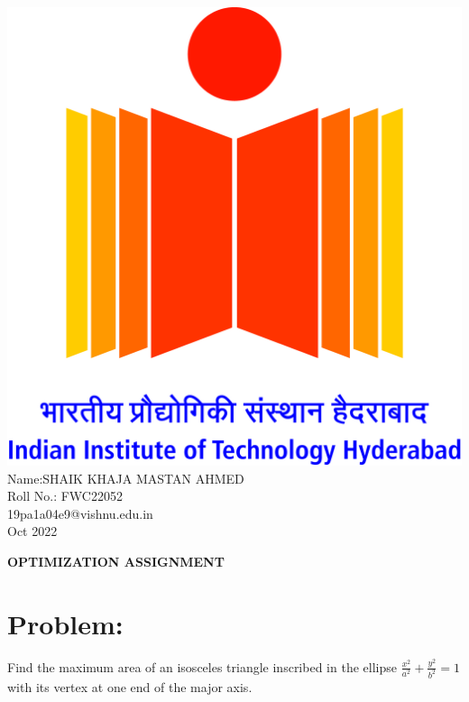 \documentclass[10pt,a4paper]{report}
\begin{document}
\begin{multicols}{2}
\raggedright {\includegraphics[scale=0.06]{IITH logo.jpg}} \vspace{3mm}\\ \raggedleft Name:SHAIK KHAJA MASTAN AHMED\vspace{2mm}\\ 
\raggedleft Roll No.: FWC22052\vspace{2mm}\\ 
\raggedleft 19pa1a04e9@vishnu.edu.in \vspace{2mm}\\ 
\raggedleft Oct 2022 \vspace{5mm}\\
\end{multicols}

\centering \Large \textbf{OPTIMIZATION ASSIGNMENT} \normalsize \vspace{10mm}


\section{Problem:}  
\fi
Find the maximum area of an isosceles triangle inscribed in the ellipse $\frac{x^2}{a^2} + \frac{y^2}{b^2} = 1$ with its vertex at one end of the major axis.
\\
\solution
\iffalse
\end{document}

